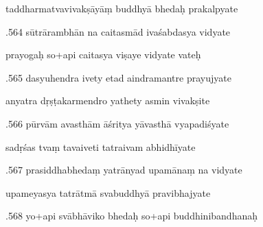 \documentclass[article,12pt,a4paper]{memoir}%
\newcounter{parCount}
\begin{document}
	  
	  \pstart \leavevmode%
	taddharmatvavivakṣāyāṃ buddhyā bhedaḥ prakalpyate 
	{}
	\pend%
      

	  
	  \pstart {}.564 sūtrārambhān na caitasmād ivaśabdasya vidyate 
	{}
	\pend%
      

	  
	  \pstart \leavevmode%
	prayogaḥ so+api caitasya viṣaye vidyate vateḥ 
	{}
	\pend%
      

	  
	  \pstart {}.565 dasyuhendra ivety etad aindramantre prayujyate 
	{}
	\pend%
      

	  
	  \pstart \leavevmode%
	anyatra dṛṣṭakarmendro yathety asmin vivakṣite 
	{}
	\pend%
      

	  
	  \pstart {}.566 pūrvām avasthām āśritya yāvasthā vyapadiśyate 
	{}
	\pend%
      

	  
	  \pstart \leavevmode%
	sadṛśas tvaṃ tavaiveti tatraivam abhidhīyate 
	{}
	\pend%
      

	  
	  \pstart {}.567 prasiddhabhedaṃ yatrānyad upamānaṃ na vidyate 
	{}
	\pend%
      

	  
	  \pstart \leavevmode%
	upameyasya tatrātmā svabuddhyā pravibhajyate 
	{}
	\pend%
      

	  
	  \pstart {}.568 yo+api svābhāviko bhedaḥ so+api buddhinibandhanaḥ 
	{}
	\pend%
      
\end{document}
